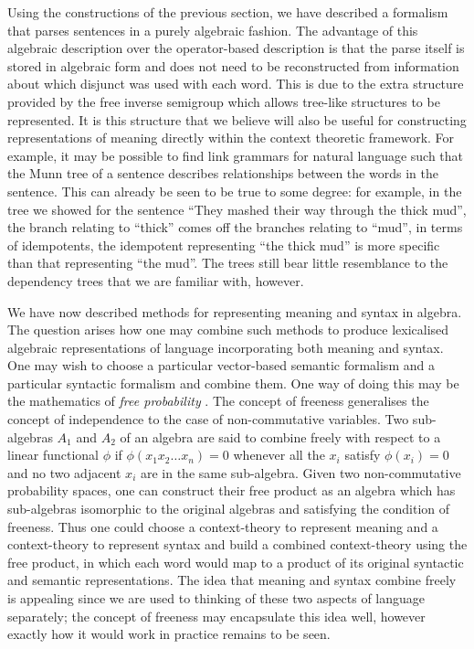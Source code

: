 Using the constructions of the previous section, we have described a formalism that parses sentences in a purely algebraic fashion. The advantage of this algebraic description over the operator-based description is that the parse itself is stored in algebraic form and does not need to be reconstructed from information about which disjunct was used with each word. This is due to the extra structure provided by the free inverse semigroup which allows tree-like structures to be represented. It is this structure that we believe will also be useful for constructing representations of meaning directly within the context theoretic framework. For example, it may be possible to find link grammars for natural language such that the Munn tree of a sentence describes relationships between the words in the sentence. This can already be seen to be true to some degree: for example, in the tree we showed for the sentence ``They mashed their way through the thick mud'', the branch relating to ``thick'' comes off the branches relating to ``mud'', in terms of idempotents, the idempotent representing ``the thick mud'' is more specific than that representing ``the mud''. The trees still bear little resemblance to the dependency trees that we are familiar with, however.

We have now described methods for representing meaning and syntax in algebra. The question arises how one may combine such methods to produce lexicalised algebraic representations of language incorporating both meaning and syntax. One may wish to choose a particular vector-based semantic formalism and a particular syntactic formalism and combine them. One way of doing this may be the mathematics of \emph{free probability} \citep{Voiculescu:97}. The concept of freeness generalises the concept of independence to the case of non-commutative variables. Two sub-algebras $A_1$ and $A_2$ of an algebra are said to combine freely with respect to a linear functional $\phi$ if $\phi(x_1x_2\ldots x_n) = 0$ whenever all the $x_i$ satisfy $\phi(x_i) = 0$ and no two adjacent $x_i$ are in the same sub-algebra. Given two non-commutative probability spaces, one can construct their free product as an algebra which has sub-algebras isomorphic to the original algebras and satisfying the condition of freeness. Thus one could choose a context-theory to represent meaning and a context-theory to represent syntax and build a combined context-theory using the free product, in which each word would map to a product of its original syntactic and semantic representations. The idea that meaning and syntax combine freely is appealing since we are used to thinking of these two aspects of language separately; the concept of freeness may encapsulate this idea well, however exactly how it would work in practice remains to be seen.

